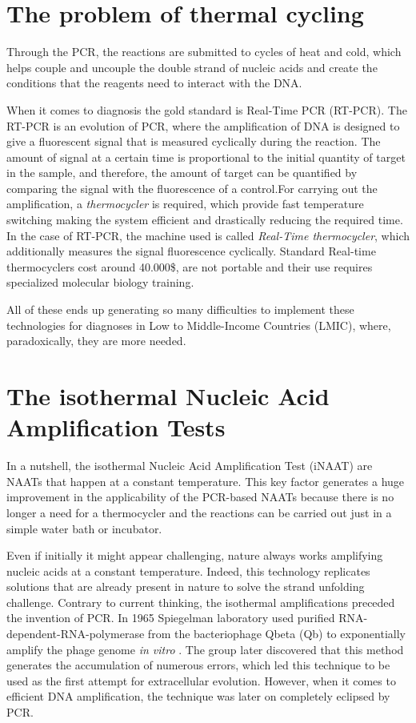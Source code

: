 \section{The problem of thermal cycling}

Through the PCR, the reactions are submitted to cycles of heat and cold, which helps couple and uncouple the double strand of nucleic acids and create the conditions that the reagents need to interact with the DNA. 

When it comes to diagnosis the gold standard is Real-Time PCR (RT-PCR)\cite{world_health_organization_laboratory_2016}\cite{world_health_organization_interim_2015}\cite{world_health_organization_recommendations_2021}. The RT-PCR is an evolution of PCR, where the amplification of DNA is designed to give a fluorescent signal that is measured cyclically during the reaction. The amount of signal at a certain time is proportional to the initial quantity of target in the sample, and therefore, the amount of target can be quantified by comparing the signal with the fluorescence of a control.For carrying out the amplification, a \emph{thermocycler} is required, which provide fast temperature switching making the system efficient and drastically reducing the required time. In the case of RT-PCR, the machine used is called \emph{Real-Time thermocycler}, which additionally measures the signal fluorescence cyclically. Standard Real-time thermocyclers cost around 40.000\$, are not portable and their use requires specialized molecular biology training.

All of these ends up generating so many difficulties to implement these technologies for diagnoses in Low to Middle-Income Countries (LMIC), where, paradoxically, they are more needed.

\section{The isothermal Nucleic Acid Amplification Tests}

In a nutshell, the isothermal Nucleic Acid Amplification Test (iNAAT) are  NAATs that happen at a constant temperature. This key factor generates a huge improvement in the applicability of the PCR-based NAATs because there is no longer a need for a thermocycler and the reactions can be carried out just in a simple water bath or incubator. 

Even if initially it might appear challenging, nature always works amplifying nucleic acids at a constant temperature. Indeed, this technology replicates solutions that are already present in nature to solve the strand unfolding challenge. Contrary to current thinking, the isothermal amplifications preceded the invention of PCR. In 1965 Spiegelman laboratory used purified RNA-dependent-RNA-polymerase from the bacteriophage Qbeta (Qb) to exponentially amplify the phage genome \emph{in vitro} \cite{spiegelman_synthesis_1965}. The group later discovered that this method generates the accumulation of numerous errors, which led this technique to be used as the first attempt for extracellular evolution. However, when it comes to efficient DNA amplification, the technique was later on completely eclipsed by PCR.

